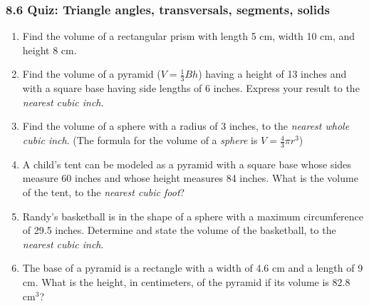 

\fancyhead[LE]{\thepage}



\subsubsection*{8.6 Quiz: Triangle angles, transversals, segments, solids}
\begin{enumerate}
\item Find the volume of a rectangular prism with length 5 cm, width 10 cm, and height 8 cm. \vspace{2cm}

\item Find the volume of a pyramid ($V=\frac{1}{3}Bh$) having a height of 13 inches and with a square base having side lengths of 6 inches. Express your result to the \emph{nearest cubic inch}. \vspace{3cm}


\item Find the volume of a sphere with a radius of 3 inches, to the \emph{nearest whole cubic inch}. (The formula for the volume of a \emph{sphere} is $V=\frac{4}{3}\pi r^3$) \vspace{4cm}

\item A child's tent can be modeled as a pyramid with a square base whose sides measure 60 inches and whose height measures 84 inches. What is the volume of the tent, to the \emph{nearest cubic foot}?

\newpage
\item Randy's basketball is in the shape of a sphere with a maximum circumference of 29.5 inches. Determine and state the volume of the basketball, to the \emph{nearest cubic inch}. \vspace{4cm}

\item The base of a pyramid is a rectangle with a width of 4.6 cm and a
length of 9 cm. What is the height, in centimeters, of the pyramid if
its volume is 82.8 cm$^3$? \vspace{4cm}


\end{enumerate}
